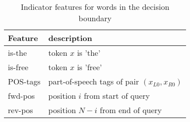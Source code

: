 \begin{table}[t]
 \caption{Indicator features for words in the decision boundary}
 \label{table-indicator-features-bergsma-2007}
 \centering
 \small
 \begin{tabular}{@{}ll@{}}
  \toprule
  Feature & description \\
  \midrule
  is-the & token $x$ is 'the'\\
  is-free & token $x$ is 'free'\\
  POS-tags & part-of-speech tags of pair $(x_{L0},x_{R0})$\\
  fwd-pos & position $i$ from start of query\\
  rev-pos & position $N-i$ from end of query\\
  \bottomrule
 \end{tabular}
\end{table}
